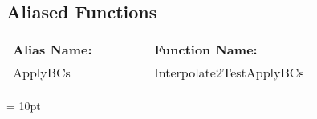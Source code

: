 \subsection*{Aliased Functions}

\hspace{5mm}

 \begin{tabular*}{160mm}{ll} 

{\bf Alias Name:} ~~~~~~~ & {\bf Function Name:} \\ 
ApplyBCs & Interpolate2TestApplyBCs \\ 
\end{tabular*} 



\vspace{5mm}\parskip = 10pt 
